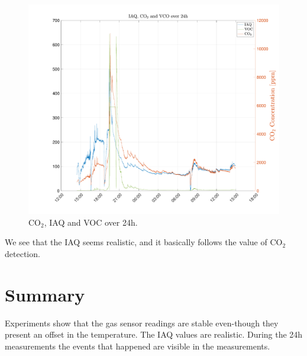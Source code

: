 \documentclass[DIV=14]{scrartcl}
\begin{document}
    \begin{figure}[!ht]
        \centering
        \includegraphics[width=.8\textwidth]{plots/plotCO2IAQVOC}
        \caption{$\mathrm{CO_2}$, IAQ and VOC over 24h.}
        \label{fig:iaqCO2VOC}
    \end{figure}

    We see that the IAQ seems realistic, and it basically follows the value of $\mathrm{CO_2}$ detection.
    \section{Summary}
    Experiments show that the gas sensor readings are stable even-though they present an offset in the temperature.
    The IAQ values are realistic.
    During the 24h measurements the events that happened are visible in the measurements.
\end{document}
